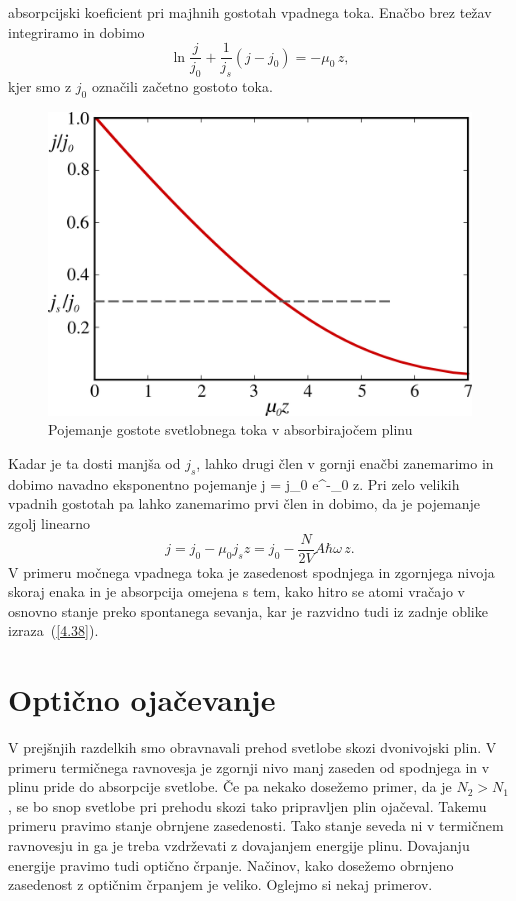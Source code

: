 absorpcijski koeficient pri majhnih gostotah vpadnega toka.
Enačbo brez težav integriramo in dobimo 
\begin{equation}
\ln\frac{j}{j_{0}}+\frac{1}{j_{s}}(j-j_{0})=-\mu_{0}\, z,\label{4.37}
\end{equation}
kjer smo z $j_{0}$ označili začetno gostoto toka. 
\begin{figure}[h]
\centering
\includegraphics[width=8truecm]{slike/05_jabs.png}
\caption{Pojemanje gostote svetlobnega toka v absorbirajočem plinu}
\label{fig:abs2}
\end{figure}
Kadar je ta dosti
manjša od $j_{s}$, lahko drugi člen v gornji enačbi zanemarimo in dobimo 
navadno eksponentno pojemanje
\beq
j = j_0 e^{-\mu_0 z}.
\eeq
Pri zelo velikih vpadnih gostotah pa lahko zanemarimo prvi člen in dobimo, 
da je pojemanje zgolj linearno
\begin{equation}
j=j_{0}-\mu_{0}j_{s}z=j_{0}-\frac{N}{2V}A\hbar\omega\, z.
\label{4.38}
\end{equation}
V primeru močnega vpadnega toka je zasedenost spodnjega in zgornjega nivoja skoraj
enaka in je absorpcija omejena s tem, kako hitro se atomi vračajo
v osnovno stanje preko spontanega sevanja, kar je razvidno tudi iz
zadnje oblike izraza~(\ref{4.38}).

\section{Optično ojačevanje}
V prejšnjih razdelkih smo obravnavali prehod svetlobe skozi dvonivojski plin. V primeru
termičnega ravnovesja je zgornji nivo manj zaseden od spodnjega in v plinu pride
do absorpcije svetlobe. Če pa nekako dosežemo primer, da je $N_{2}>N_{1}$, 
se bo snop svetlobe pri prehodu skozi tako pripravljen plin ojačeval. 
Takemu primeru pravimo stanje obrnjene zasedenosti. 
Tako stanje seveda ni v termičnem ravnovesju in ga je treba vzdrževati z dovajanjem 
energije plinu. Dovajanju energije pravimo tudi optično črpanje. 
Načinov, kako dosežemo obrnjeno zasedenost z optičnim črpanjem je veliko. Oglejmo 
si nekaj primerov. 


